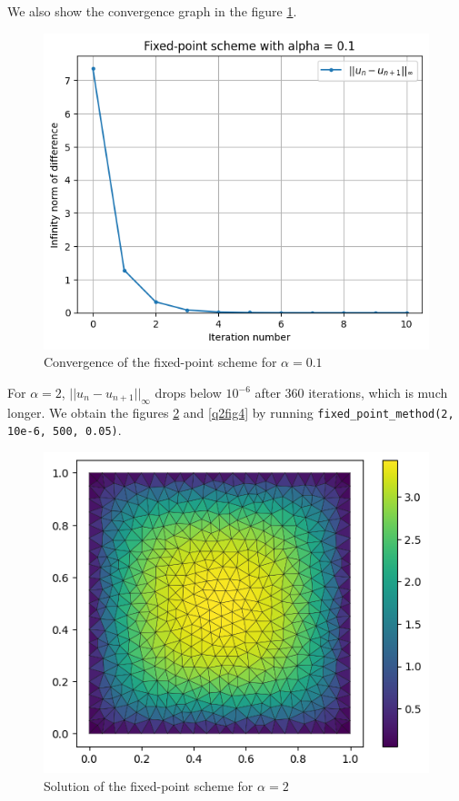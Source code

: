 \documentclass[11pt, a4paper, twoside]{article}
\begin{document}
We also show the convergence graph in the figure \ref{q2fig2}.
\begin{figure}[H]
\centering
\includegraphics[scale = 0.7]{../Figures/fixed_conv_alpha0.1.png}
\caption{Convergence of the fixed-point scheme for $\alpha=0.1$}
\label{q2fig2}
\end{figure}

 For $\alpha=2$, $||u_n -u_{n+1}||_\infty$  drops below $10^{-6}$ after 360 iterations, which is much longer. We obtain the figures \ref{q2fig3} and \ref{q2fig4} by running \verb+fixed_point_method(2, 10e-6, 500, 0.05)+.
 
 \begin{figure}[H]
\centering
\includegraphics[scale = 0.7]{../Figures/fixed_sol_alpha2.png}
\caption{Solution of the fixed-point scheme for $\alpha=2$}
\label{q2fig3}
\end{figure}
\end{document}
